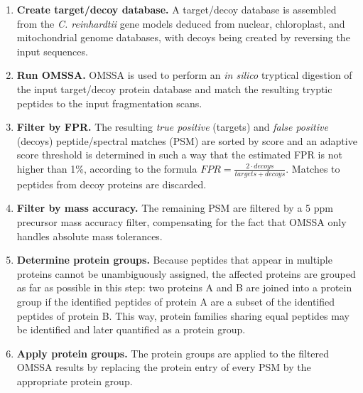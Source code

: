 \documentclass[11pt,letterpaper]{article}
\begin{document}
\begin{enumerate}

\item {\bf Create target/decoy database.} 
A target/decoy database is assembled from the {\em C. reinhardtii} 
gene models deduced from nuclear, chloroplast, and mitochondrial genome 
databases, with decoys being created by 
reversing the input sequences.

\item {\bf Run OMSSA.} 
OMSSA is used to perform an {\em in silico} tryptical digestion of the input 
target/decoy protein database and match the resulting tryptic peptides to the 
input fragmentation scans.

\item {\bf Filter by FPR.}
The resulting {\em true positive} (targets) and {\em false positive} (decoys) 
peptide/spectral matches (PSM) are sorted by score and an adaptive score 
threshold is determined in such a way that the estimated FPR is not higher 
than 1\%, according to the formula 
$FPR = \frac{2 \cdot decoys}{targets + decoys}$. 
Matches to peptides from decoy proteins are discarded.

\item {\bf Filter by mass accuracy.}
The remaining PSM are filtered by a 5 ppm precursor mass accuracy filter,
compensating for the fact that OMSSA only handles absolute mass tolerances.

\item {\bf Determine protein groups.}
Because peptides that appear in multiple proteins cannot be unambiguously 
assigned, the affected proteins are grouped as far as possible in this 
step: two proteins A and B are joined 
into a protein group if the identified peptides of protein A are a subset of 
the identified peptides of protein B. This way, protein families sharing equal 
peptides may be identified and later quantified as a protein group.

\item {\bf Apply protein groups.}
The protein groups are applied to the filtered OMSSA results by replacing the
protein entry of every PSM by the appropriate protein group.


\end{enumerate}
\end{document}
